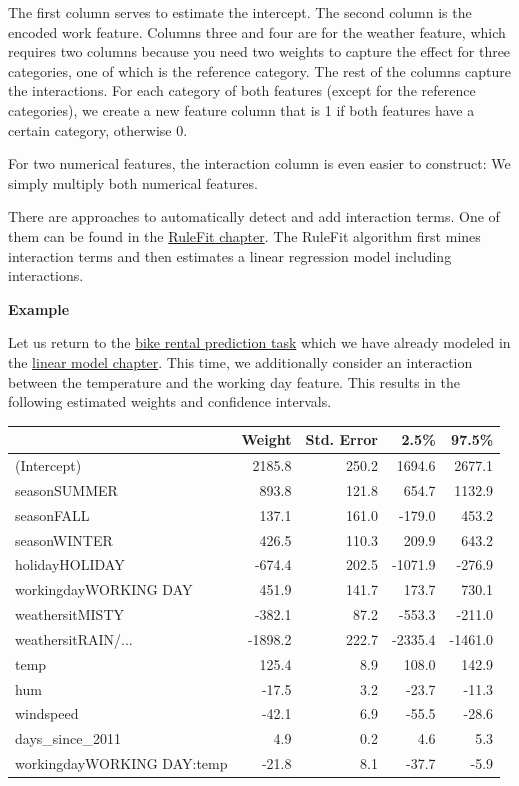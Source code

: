 \documentclass[
  12pt,
]{krantz}
\begin{document}
The first column serves to estimate the intercept.
The second column is the encoded work feature.
Columns three and four are for the weather feature, which requires two columns because you need two weights to capture the effect for three categories, one of which is the reference category.
The rest of the columns capture the interactions.
For each category of both features (except for the reference categories), we create a new feature column that is 1 if both features have a certain category, otherwise 0.

For two numerical features, the interaction column is even easier to construct:
We simply multiply both numerical features.

There are approaches to automatically detect and add interaction terms.
One of them can be found in the \protect\hyperlink{rulefit}{RuleFit chapter}.
The RuleFit algorithm first mines interaction terms and then estimates a linear regression model including interactions.

\textbf{Example}

Let us return to the \protect\hyperlink{bike-data}{bike rental prediction task} which we have already modeled in the \protect\hyperlink{limo}{linear model chapter}.
This time, we additionally consider an interaction between the temperature and the working day feature.
This results in the following estimated weights and confidence intervals.

\begin{tabular}{>{\raggedright\arraybackslash}p{4.1cm}|r|r|r|r}
\hline
  & Weight & Std. Error & 2.5\% & 97.5\%\\
\hline
(Intercept) & 2185.8 & 250.2 & 1694.6 & 2677.1\\
\hline
seasonSUMMER & 893.8 & 121.8 & 654.7 & 1132.9\\
\hline
seasonFALL & 137.1 & 161.0 & -179.0 & 453.2\\
\hline
seasonWINTER & 426.5 & 110.3 & 209.9 & 643.2\\
\hline
holidayHOLIDAY & -674.4 & 202.5 & -1071.9 & -276.9\\
\hline
workingdayWORKING DAY & 451.9 & 141.7 & 173.7 & 730.1\\
\hline
weathersitMISTY & -382.1 & 87.2 & -553.3 & -211.0\\
\hline
weathersitRAIN/... & -1898.2 & 222.7 & -2335.4 & -1461.0\\
\hline
temp & 125.4 & 8.9 & 108.0 & 142.9\\
\hline
hum & -17.5 & 3.2 & -23.7 & -11.3\\
\hline
windspeed & -42.1 & 6.9 & -55.5 & -28.6\\
\hline
days\_since\_2011 & 4.9 & 0.2 & 4.6 & 5.3\\
\hline
workingdayWORKING DAY:temp & -21.8 & 8.1 & -37.7 & -5.9\\
\hline
\end{tabular}
\end{document}
